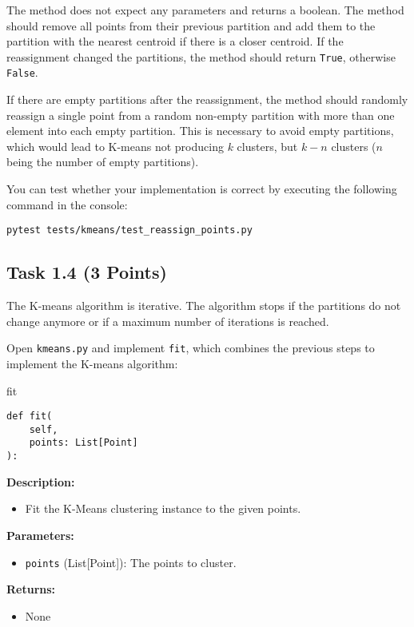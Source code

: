 \documentclass[
english,
smallborders
]{i6prcsht}
\newcommand{\points}[1]{\hfill \color{red}(#1 Points)\color{black}}
\begin{document}
The method does not expect any parameters and returns a boolean. The method should remove all points from their previous partition and add them to the partition with the nearest centroid if there is a closer centroid. If the reassignment changed the partitions, the method should return \texttt{True}, otherwise \texttt{False}.

If there are empty partitions after the reassignment, the method should randomly reassign a single point from a random non-empty partition with more than one element into each empty partition. This is necessary to avoid empty partitions, which would lead to K-means not producing $k$ clusters, but $k-n$ clusters ($n$ being the number of empty partitions).

You can test whether your implementation is correct by executing the following command in the console:

\vspace*{0.3cm}

\begin{lstlisting}
pytest tests/kmeans/test_reassign_points.py
\end{lstlisting}

\newpage

\subsection*{Task 1.4 \points{3}}

The K-means algorithm is iterative. The algorithm stops if the partitions do not change anymore or if a maximum number of iterations is reached.

Open \texttt{kmeans.py} and implement \texttt{fit}, which combines the previous steps to implement the K-means algorithm:

\vspace*{0.3cm}

\begin{functionbox}{fit}
	\begin{lstlisting}[numbers=none]
def fit(
    self, 
    points: List[Point]
):
\end{lstlisting}
	
	\textbf{Description:}
	\begin{itemize}[leftmargin=*,topsep=0pt]
		\item Fit the K-Means clustering instance to the given points.
	\end{itemize}
	
	\textbf{Parameters:}
	\begin{itemize}[leftmargin=*,topsep=0pt]
		\item \texttt{points} (List[Point]): The points to cluster.
	\end{itemize}
	
	\textbf{Returns:}
	\begin{itemize}[leftmargin=*,topsep=0pt]
		\item None
	\end{itemize}
\end{functionbox}
\end{document}
